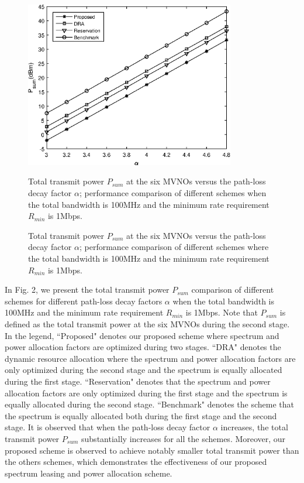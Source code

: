 \documentclass[journal]{IEEEtran}
\begin{document}
\begin{IEEEkeywords}
\begin{figure}
	\centering
	\includegraphics[width=3.6in]{P_alpha.eps}
	\caption{Total transmit power $P_{sum}$ at the six MVNOs versus the path-loss decay factor $\alpha$; performance comparison of different schemes when the total bandwidth is 100MHz and the minimum rate requirement $R_{min}$ is 1Mbps.}
	\caption{Total transmit power $P_{sum}$ at the six MVNOs versus the path-loss decay factor $\alpha$; performance comparison of different schemes where the total bandwidth is 100MHz and the minimum rate requirement $R_{min}$ is 1Mbps.}
\end{figure}
In Fig. 2, we present the total transmit power $P_{sum}$ comparison of different schemes for different path-loss decay factors $\alpha$ when the total bandwidth is 100MHz and the minimum rate requirement $R_{min}$ is 1Mbps. Note that $P_{sum}$ is defined as the total transmit power at the six MVNOs during the second stage. In the legend, ``Proposed" denotes our proposed scheme where spectrum and power allocation factors are optimized during two stages. ``DRA" denotes the dynamic resource allocation where the spectrum and power allocation factors are only optimized during the second stage and the spectrum is equally allocated during the first stage. ``Reservation" denotes that the spectrum and power allocation factors are only optimized during the first stage and the spectrum is equally allocated during the second stage. ``Benchmark" denotes the scheme that the spectrum is equally allocated both during the first stage and the second stage. It is observed that when the path-loss decay factor $\alpha$ increases, the total transmit power $P_{sum}$ substantially increases for all the schemes. Moreover, our proposed scheme is observed to achieve notably smaller total transmit power than the others schemes, which demonstrates the effectiveness of our proposed spectrum leasing and power allocation scheme.

\end{IEEEkeywords}
\end{document}
